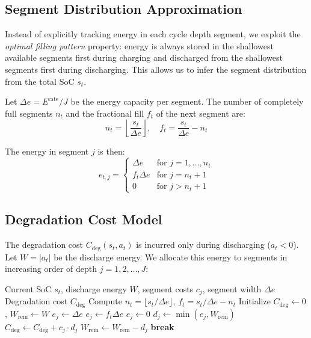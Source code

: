\documentclass[10pt,twocolumn]{article}
\begin{document}
\subsection{Segment Distribution Approximation}

Instead of explicitly tracking energy in each cycle depth segment, we exploit the \emph{optimal filling pattern} property: energy is always stored in the shallowest available segments first during charging and discharged from the shallowest segments first during discharging. This allows us to infer the segment distribution from the total SoC $s_t$.

Let $\Delta e = E^{\text{rate}}/J$ be the energy capacity per segment. The number of completely full segments $n_t$ and the fractional fill $f_t$ of the next segment are:
\[
n_t = \left\lfloor \frac{s_t}{\Delta e} \right\rfloor, \quad
f_t = \frac{s_t}{\Delta e} - n_t
\]

The energy in segment $j$ is then:
\[
e_{t,j} = 
\begin{cases}
\Delta e & \text{for } j = 1, \ldots, n_t \\
f_t \Delta e & \text{for } j = n_t + 1 \\
0 & \text{for } j > n_t + 1
\end{cases}
\]

\subsection{Degradation Cost Model}

The degradation cost $C_{\text{deg}}(s_t, a_t)$ is incurred only during discharging ($a_t < 0$). Let $W = |a_t|$ be the discharge energy. We allocate this energy to segments in increasing order of depth $j = 1, 2, \ldots, J$:

\begin{algorithm}[htb]
\caption{Degradation Cost Computation}
\begin{algorithmic}[1]
\Require Current SoC $s_t$, discharge energy $W$, segment costs $c_j$, segment width $\Delta e$
\Ensure Degradation cost $C_{\text{deg}}$
\State Compute $n_t = \lfloor s_t/\Delta e \rfloor$, $f_t = s_t/\Delta e - n_t$
\State Initialize $C_{\text{deg}} \gets 0$, $W_{\text{rem}} \gets W$
        \State $e_j \gets \Delta e$
        \State $e_j \gets f_t \Delta e$
    \Else
        \State $e_j \gets 0$
    \EndIf
    \State $d_j \gets \min(e_j, W_{\text{rem}})$
    \State $C_{\text{deg}} \gets C_{\text{deg}} + c_j \cdot d_j$
    \State $W_{\text{rem}} \gets W_{\text{rem}} - d_j$
        \State \textbf{break}
    \EndIf
\EndFor
\end{algorithmic}
\end{algorithm}
\end{document}
